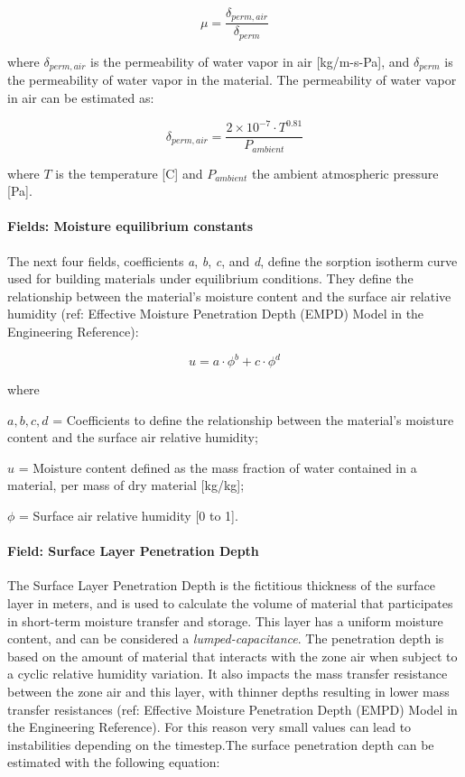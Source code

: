 \[ \mu = \frac {\delta_{perm,air}} {\delta_{perm}} \]

where \(\delta_{perm,air}\) is the permeability of water vapor in air {[}kg/m-s-Pa{]}, and \(\delta_{perm}\) is the permeability of water vapor in the material. The permeability of water vapor in air can be estimated as:

\[ \delta_{perm,air} = \frac {2 \times 10^{-7} \cdot T^{0.81}} {P_{ambient}} \]

where \(T\) is the temperature {[}C{]} and \(P_{ambient}\) the ambient atmospheric pressure {[}Pa{]}.

\paragraph{Fields: Moisture equilibrium constants}\label{fields-moisture-equilibrium-constants}

The next four fields, coefficients \emph{a}, \emph{b}, \emph{c}, and \emph{d}, define the sorption isotherm curve used for building materials under equilibrium conditions. They define the relationship between the material's moisture content and the surface air relative humidity (ref: Effective Moisture Penetration Depth (EMPD) Model in the Engineering Reference):

\[ u = a \cdot \phi^b + c \cdot \phi^d \]

where

\(a,b,c,d\) = Coefficients to define the relationship between the material's moisture content and the surface air relative humidity;

\(u\) = Moisture content defined as the mass fraction of water contained in a material, per mass of dry material {[}kg/kg{]};

\(\phi\) = Surface air relative humidity {[}0 to 1{]}.

\paragraph{Field: Surface Layer Penetration Depth}\label{field-surface-layer-penetration-depth}

The Surface Layer Penetration Depth is the fictitious thickness of the surface layer in meters, and is used to calculate the volume of material that participates in short-term moisture transfer and storage. This layer has a uniform moisture content, and can be considered a \emph{lumped-capacitance}. The penetration depth is based on the amount of material that interacts with the zone air when subject to a cyclic relative humidity variation. It also impacts the mass transfer resistance between the zone air and this layer, with thinner depths resulting in lower mass transfer resistances (ref: Effective Moisture Penetration Depth (EMPD) Model in the Engineering Reference). For this reason very small values can lead to instabilities depending on the timestep.The surface penetration depth can be estimated with the following equation:

